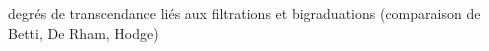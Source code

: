 degrés de transcendance liés aux filtrations et bigraduations (comparaison de Betti, De Rham, Hodge)
